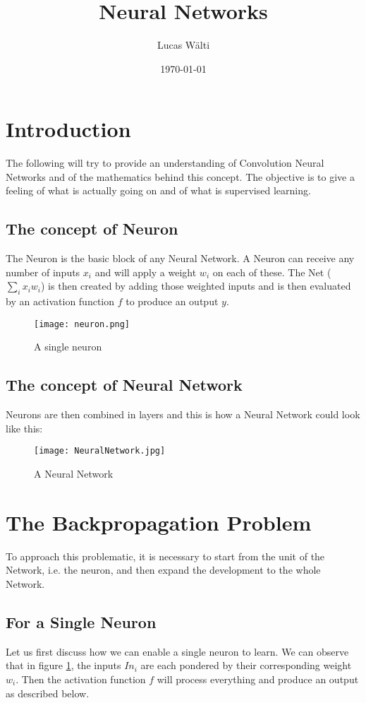 \documentclass[10pt,a4paper]{article}
\title{Neural Networks}
\author{Lucas Wälti}
\date{\today}
\begin{document}
\maketitle
\thispagestyle{empty}	%

\newpage
\section{Introduction}
The following will try to provide an understanding of Convolution Neural Networks and of the mathematics behind this concept. The objective is to give a feeling of what is actually going on and of what is supervised learning.  
\subsection{The concept of Neuron}
The Neuron is the basic block of any Neural Network. A Neuron can receive any number of inputs $x_i$ and will apply a weight $w_i$ on each of these. The Net ($\sum_{i}{x_iw_i}$) is then created by adding those weighted inputs and is then evaluated by an activation function $f$ to produce an output $y$. 

\begin{figure}[h] %
\centering
\texttt{[image: neuron.png]}
\caption{A single neuron}
\label{n}
\end{figure}

\subsection{The concept of Neural Network}
Neurons are then combined in layers and this is how a Neural Network could look like this: 

\begin{figure}[h] %
\centering
\texttt{[image: NeuralNetwork.jpg]}
\caption{A Neural Network}
\label{nn}
\end{figure}

\newpage
\section{The Backpropagation Problem}
To approach this problematic, it is necessary to start from the unit of the Network, i.e. the neuron, and then expand the development to the whole Network. 
\subsection{For a Single Neuron}
Let us first discuss how we can enable a single neuron to learn. We can observe that in figure \ref{n}, the inputs $In_i$ are each pondered by their corresponding weight $w_i$. Then the activation function $f$ will process everything and produce an output as described below. 
\end{document}
